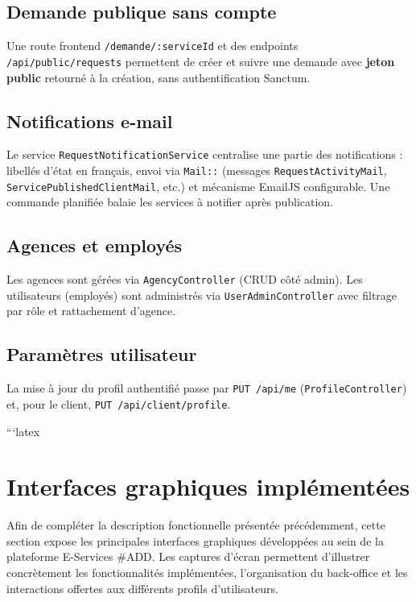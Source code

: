 \subsection{Demande publique sans compte}

Une route frontend \texttt{/demande/:serviceId} et des endpoints \texttt{/api/public/requests} permettent de créer et suivre une demande avec \textbf{jeton public} retourné à la création, sans authentification Sanctum.

\subsection{Notifications e-mail}

Le service \texttt{RequestNotificationService} centralise une partie des notifications : libellés d'état en français, envoi via \texttt{Mail::} (messages \texttt{RequestActivityMail}, \texttt{ServicePublishedClientMail}, etc.) et mécanisme EmailJS configurable. Une commande planifiée balaie les services à notifier après publication.

\subsection{Agences et employés}

Les agences sont gérées via \texttt{AgencyController} (CRUD côté admin). Les utilisateurs (employés) sont administrés via \texttt{UserAdminController} avec filtrage par rôle et rattachement d'agence.

\subsection{Paramètres utilisateur}

La mise à jour du profil authentifié passe par \texttt{PUT /api/me} (\texttt{ProfileController}) et, pour le client, \texttt{PUT /api/client/profile}.

```latex
\section{Interfaces graphiques implémentées}

Afin de compléter la description fonctionnelle présentée précédemment, cette section expose les principales interfaces graphiques développées au sein de la plateforme E-Services \#ADD. Les captures d'écran permettent d'illustrer concrètement les fonctionnalités implémentées, l'organisation du back-office et les interactions offertes aux différents profils d'utilisateurs.

